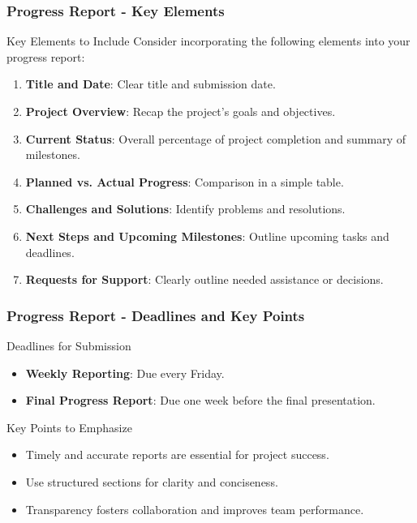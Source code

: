 \documentclass[aspectratio=169]{beamer}
\begin{document}
\begin{frame}[fragile]
  \frametitle{Progress Report - Key Elements}
  \begin{block}{Key Elements to Include}
    Consider incorporating the following elements into your progress report:
  \end{block}
  \begin{enumerate}
    \item \textbf{Title and Date}: Clear title and submission date.
    \item \textbf{Project Overview}: Recap the project’s goals and objectives.
    \item \textbf{Current Status}: Overall percentage of project completion and summary of milestones.
    \item \textbf{Planned vs. Actual Progress}: Comparison in a simple table.
    \item \textbf{Challenges and Solutions}: Identify problems and resolutions.
    \item \textbf{Next Steps and Upcoming Milestones}: Outline upcoming tasks and deadlines.
    \item \textbf{Requests for Support}: Clearly outline needed assistance or decisions.
  \end{enumerate}
\end{frame}

\begin{frame}[fragile]
  \frametitle{Progress Report - Deadlines and Key Points}
  \begin{block}{Deadlines for Submission}
    \begin{itemize}
      \item \textbf{Weekly Reporting}: Due every Friday.
      \item \textbf{Final Progress Report}: Due one week before the final presentation.
    \end{itemize}
  \end{block}
  \begin{block}{Key Points to Emphasize}
    \begin{itemize}
      \item Timely and accurate reports are essential for project success.
      \item Use structured sections for clarity and conciseness.
      \item Transparency fosters collaboration and improves team performance.
    \end{itemize}
  \end{block}
\end{frame}
\end{document}
